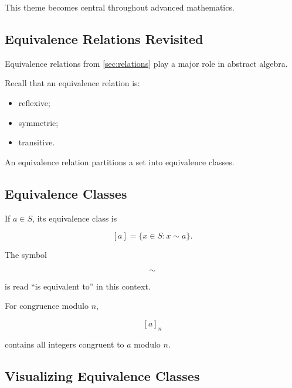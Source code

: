 This theme becomes central throughout advanced mathematics.

\subsection{Equivalence Relations Revisited}
\label{subsec:equivalence-relations-algebra}

Equivalence relations from \cref{sec:relations} play a major role in abstract
algebra.

Recall that an equivalence relation is:

\begin{itemize}
    \item reflexive;
    \item symmetric;
    \item transitive.
\end{itemize}

An equivalence relation partitions a set into equivalence classes.

\subsection{Equivalence Classes}
\label{subsec:equivalence-classes-algebra}

If \(a\in S\), its equivalence class is

\[ [a]=\{x\in S:x\sim a\}. \]

The symbol

\[ \sim \]

is read ``is equivalent to'' in this context.

For congruence modulo \(n\),

\[ [a]_n \]

contains all integers congruent to \(a\) modulo \(n\).

\subsection{Visualizing Equivalence Classes}
\label{subsec:visual-equivalence-classes}

\begin{center}
\end{center}

